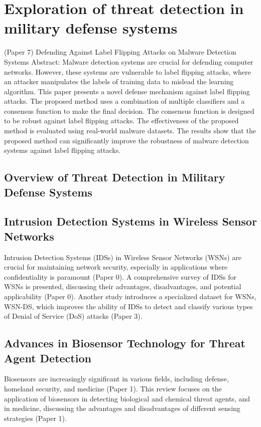 \documentclass{article}
\begin{document}
\clearpage
\section{Exploration of threat detection in military defense systems}

(Paper 7) Defending Against Label Flipping Attacks on Malware Detection Systems
Abstract: Malware detection systems are crucial for defending computer networks. However, these systems are vulnerable to label flipping attacks, where an attacker manipulates the labels of training data to mislead the learning algorithm. This paper presents a novel defense mechanism against label flipping attacks. The proposed method uses a combination of multiple classifiers and a consensus function to make the final decision. The consensus function is designed to be robust against label flipping attacks. The effectiveness of the proposed method is evaluated using real-world malware datasets. The results show that the proposed method can significantly improve the robustness of malware detection systems against label flipping attacks.

\subsection{Overview of Threat Detection in Military Defense Systems}

\subsection{Intrusion Detection Systems in Wireless Sensor Networks}

Intrusion Detection Systems (IDSs) in Wireless Sensor Networks (WSNs) are crucial for maintaining network security, especially in applications where confidentiality is paramount (Paper 0). A comprehensive survey of IDSs for WSNs is presented, discussing their advantages, disadvantages, and potential applicability (Paper 0). Another study introduces a specialized dataset for WSNs, WSN-DS, which improves the ability of IDSs to detect and classify various types of Denial of Service (DoS) attacks (Paper 3).

\subsection{Advances in Biosensor Technology for Threat Agent Detection}

Biosensors are increasingly significant in various fields, including defense, homeland security, and medicine (Paper 1). This review focuses on the application of biosensors in detecting biological and chemical threat agents, and in medicine, discussing the advantages and disadvantages of different sensing strategies (Paper 1).
\end{document}
